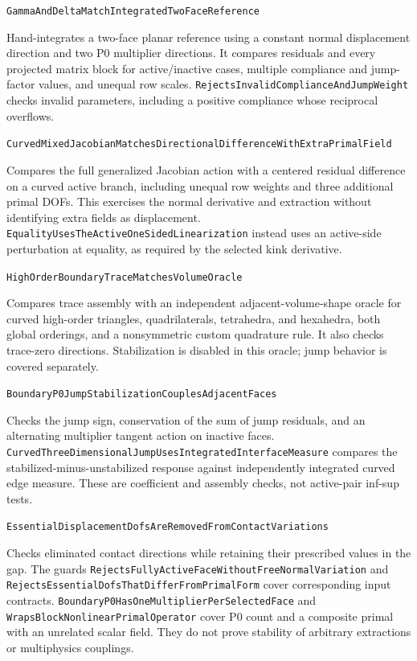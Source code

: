 \documentclass[preprint,11pt]{elsarticle}
\numberwithin{equation}{section}
\newcommand{\code}[1]{\texttt{\nolinkurl{#1}}}
\newcommand{\testname}[1]{\par\smallskip\noindent\code{#1}\par\nobreak}
\begin{document}
\testname{GammaAndDeltaMatchIntegratedTwoFaceReference}
Hand-integrates a two-face planar reference using a constant normal
displacement direction and two P0 multiplier directions. It compares
residuals and every projected matrix block for active/inactive cases,
multiple compliance and jump-factor values, and unequal row scales.
\code{RejectsInvalidComplianceAndJumpWeight} checks invalid parameters,
including a positive compliance whose reciprocal overflows.

\testname{CurvedMixedJacobianMatchesDirectionalDifferenceWithExtraPrimalField}
Compares the full generalized Jacobian action with a centered residual
difference on a curved active branch, including unequal row weights and
three additional primal DOFs. This exercises the normal derivative and
extraction without identifying extra fields as displacement.
\code{EqualityUsesTheActiveOneSidedLinearization} instead uses an
active-side perturbation at equality, as required by the selected kink
derivative.

\testname{HighOrderBoundaryTraceMatchesVolumeOracle}
Compares trace assembly with an independent adjacent-volume-shape oracle
for curved high-order triangles, quadrilaterals, tetrahedra, and hexahedra,
both global orderings, and a nonsymmetric custom quadrature rule. It
also checks trace-zero directions. Stabilization is disabled in this
oracle; jump behavior is covered separately.

\testname{BoundaryP0JumpStabilizationCouplesAdjacentFaces}
Checks the jump sign, conservation of the sum of jump residuals, and an
alternating multiplier tangent action on inactive faces.
\code{CurvedThreeDimensionalJumpUsesIntegratedInterfaceMeasure}
compares the stabilized-minus-unstabilized response against independently
integrated curved edge measure. These are coefficient and assembly checks,
not active-pair inf-sup tests.

\testname{EssentialDisplacementDofsAreRemovedFromContactVariations}
Checks eliminated contact directions while retaining their prescribed
values in the gap. The guards
\code{RejectsFullyActiveFaceWithoutFreeNormalVariation} and
\code{RejectsEssentialDofsThatDifferFromPrimalForm} cover corresponding
input contracts. \code{BoundaryP0HasOneMultiplierPerSelectedFace} and
\code{WrapsBlockNonlinearPrimalOperator} cover P0 count and a composite
primal with an unrelated scalar field. They do not prove stability of
arbitrary extractions or multiphysics couplings.
\end{document}
